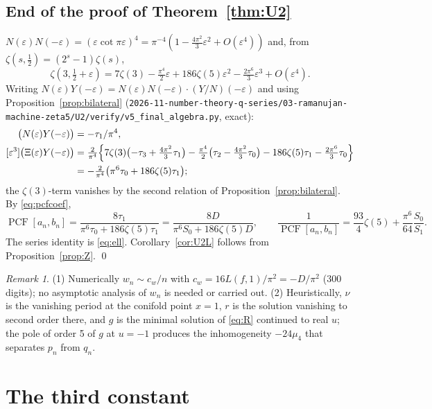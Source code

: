 \documentclass[11pt]{amsart}
\theoremstyle{definition}
\theoremstyle{remark}
\newtheorem{remark}[theorem]{Remark}
\numberwithin{equation}{section}
\newcommand{\PCF}{\operatorname{PCF}}
\newcommand{\file}[1]{\nolinkurl{2026-11-number-theory-q-series/03-ramanujan-machine-zeta5/#1}}
\begin{document}
\subsection{End of the proof of Theorem~\ref*{thm:U2}}
$N(\varepsilon)N(-\varepsilon)=(\varepsilon\cot\pi\varepsilon)^4=\pi^{-4}(1-\frac{4\pi^2}3\varepsilon^2+O(\varepsilon^4))$ and, from $\zeta(s,\frac12)=(2^s-1)\zeta(s)$,
\[
\zeta(3,\tfrac12+\varepsilon)=7\zeta(3)-\tfrac{\pi^4}2\varepsilon+186\zeta(5)\varepsilon^2-\tfrac{2\pi^6}3\varepsilon^3+O(\varepsilon^4).
\]
Writing $N(\varepsilon)Y(-\varepsilon)=N(\varepsilon)N(-\varepsilon)\cdot(Y/N)(-\varepsilon)$ and using Proposition~\ref{prop:bilateral} (\file{U2/verify/v5_final_algebra.py}, exact):
\begin{align*}
[\varepsilon^1]\bigl(N(\varepsilon)Y(-\varepsilon)\bigr)&=-\tau_1/\pi^4,\\
[\varepsilon^3]\bigl(\Xi(\varepsilon)Y(-\varepsilon)\bigr)&=\tfrac2{\pi^4}\Bigl\{7\zeta(3)\bigl(-\tau_3+\tfrac{4\pi^2}3\tau_1\bigr)-\tfrac{\pi^4}2\bigl(\tau_2-\tfrac{4\pi^2}3\tau_0\bigr)-186\zeta(5)\tau_1-\tfrac{2\pi^6}3\tau_0\Bigr\}\\
&=-\tfrac2{\pi^4}\bigl(\pi^6\tau_0+186\zeta(5)\tau_1\bigr);
\end{align*}
the $\zeta(3)$-term vanishes by the second relation of Proposition~\ref{prop:bilateral}. By \eqref{eq:pcfcoef},
\[
\PCF[a_n,b_n]=\frac{8\tau_1}{\pi^6\tau_0+186\zeta(5)\tau_1}=\frac{8D}{\pi^6S_0+186\zeta(5)D},\qquad\frac1{\PCF[a_n,b_n]}=\frac{93}4\zeta(5)+\frac{\pi^6}{64}\frac{S_0}{S_1}.
\]
The series identity is \eqref{eq:ell}. Corollary~\ref{cor:U2L} follows from Proposition~\ref{prop:Z}. \qed

\begin{remark}
(1) Numerically $w_n\sim c_w/n$ with $c_w=16L(f,1)/\pi^2=-D/\pi^2$ (300 digits); no asymptotic analysis of $w_n$ is needed or carried out. (2) Heuristically, $\nu$ is the vanishing period at the conifold point $x=1$, $r$ is the solution vanishing to second order there, and $g$ is the minimal solution of \eqref{eq:R} continued to real $u$; the pole of order 5 of $g$ at $u=-1$ produces the inhomogeneity $-24\mu_4$ that separates $p_n$ from $q_n$.
\end{remark}

\section{The third constant}\label{sec:U3}
\end{document}
